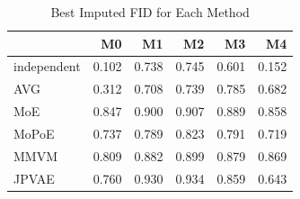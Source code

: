 \begin{table}
\caption{Best Imputed FID for Each Method}
\label{tab:best_imputed_fid}
\begin{tabular}{lrrrrr}
\toprule
 & M0 & M1 & M2 & M3 & M4 \\
\midrule
independent & 0.102 & 0.738 & 0.745 & 0.601 & 0.152 \\
AVG & 0.312 & 0.708 & 0.739 & 0.785 & 0.682 \\
MoE & 0.847 & 0.900 & 0.907 & 0.889 & 0.858 \\
MoPoE & 0.737 & 0.789 & 0.823 & 0.791 & 0.719 \\
MMVM & 0.809 & 0.882 & 0.899 & 0.879 & 0.869 \\
JPVAE & 0.760 & 0.930 & 0.934 & 0.859 & 0.643 \\
\bottomrule
\end{tabular}
\end{table}
